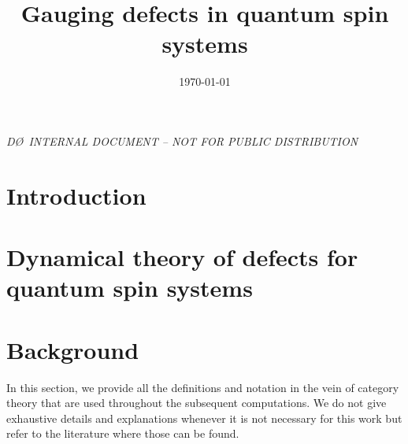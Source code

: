 



\widetext
{}
\centerline{\em D\O\ INTERNAL DOCUMENT -- NOT FOR PUBLIC DISTRIBUTION}


\title{Gauging defects in quantum spin systems}
\date{\today}


\begin{abstract}

\end{abstract}

\pacs{}
\maketitle

\section{Introduction}


\section{Dynamical theory of defects for quantum spin systems}



\section{Background}\label{S:defs}
In this section, we provide all the definitions and notation in the vein of category theory that are used throughout the subsequent computations. We do not give exhaustive details and explanations whenever it is not necessary for this work but refer to the literature where those can be found.







